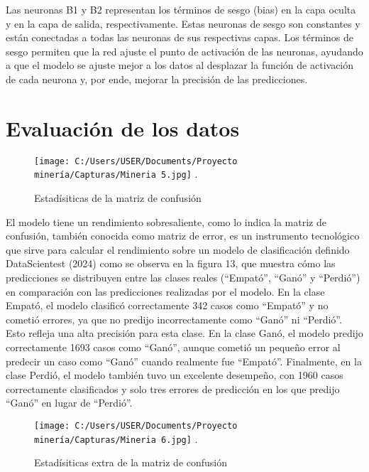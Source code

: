 \documentclass[conference,final,]{IEEEtran}
\begin{document}
Las neuronas B1 y B2 representan los términos de sesgo (bias) en la capa
oculta y en la capa de salida, respectivamente. Estas neuronas de sesgo
son constantes y están conectadas a todas las neuronas de sus
respectivas capas. Los términos de sesgo permiten que la red ajuste el
punto de activación de las neuronas, ayudando a que el modelo se ajuste
mejor a los datos al desplazar la función de activación de cada neurona
y, por ende, mejorar la precisión de las predicciones.

\section{Evaluación de los datos}\label{evaluaciuxf3n-de-los-datos}

\begin{figure}[htbp]
\centering
\texttt{[image: C:/Users/USER/Documents/Proyecto minería/Capturas/Mineria 5.jpg]}
\DeclareGraphicsExtensions.
\caption{Estadísiticas de la matriz de confusión}
\label{Mineria 5}
\end{figure}

El modelo tiene un rendimiento sobresaliente, como lo indica la matriz
de confusión, también conocida como matriz de error, es un instrumento
tecnológico que sirve para calcular el rendimiento sobre un modelo de
clasificación definido DataScientest (2024) como se observa en la figura
13, que muestra cómo las predicciones se distribuyen entre las clases
reales (``Empató'', ``Ganó'' y ``Perdió'') en comparación con las
predicciones realizadas por el modelo. En la clase Empató, el modelo
clasificó correctamente 342 casos como ``Empató'' y no cometió errores,
ya que no predijo incorrectamente como ``Ganó'' ni ``Perdió''. Esto
refleja una alta precisión para esta clase. En la clase Ganó, el modelo
predijo correctamente 1693 casos como ``Ganó'', aunque cometió un
pequeño error al predecir un caso como ``Ganó'' cuando realmente fue
``Empató''. Finalmente, en la clase Perdió, el modelo también tuvo un
excelente desempeño, con 1960 casos correctamente clasificados y solo
tres errores de predicción en los que predijo ``Ganó'' en lugar de
``Perdió''.

\begin{figure}[htbp]
\centering
\texttt{[image: C:/Users/USER/Documents/Proyecto minería/Capturas/Mineria 6.jpg]}
\DeclareGraphicsExtensions.
\caption{Estadísiticas extra de la matriz de confusión}
\label{Mineria 6}
\end{figure}
\end{document}
